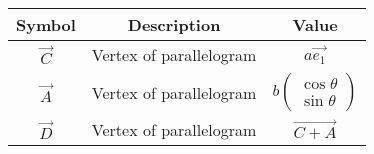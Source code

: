    \begin{tabular}{|c|c|c|}
    \hline
        \textbf{Symbol} &\textbf{Description}&\textbf{Value}  \\
        \hline
	   $\vec{C}$&Vertex of parallelogram &$a\vec{e_1}$\\
        \hline
         $\vec{A}$&Vertex of parallelogram &$b\begin{pmatrix}
             \cos{\theta}\\
             \sin{\theta}
         \end{pmatrix}$\\
        \hline
        $\vec{D}$&Vertex of parallelogram &$\vec{C+A}$\\
        \hline
    \end{tabular}
